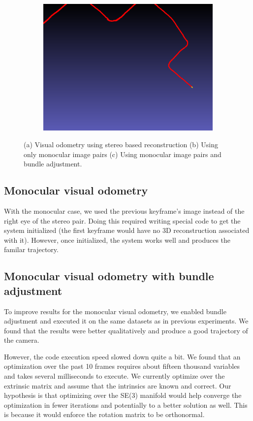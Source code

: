 \documentclass{article}
\begin{document}
\begin{figure}[h]
\begin{subfigure}[b]{.30\textwidth}
        \caption{}
    \end{subfigure}
    \begin{subfigure}[b]{.30\textwidth}
        \includegraphics[width=\linewidth]{./mono-ba.png}
        \caption{}
    \end{subfigure}
    \caption{(a) Visual odometry using stereo based reconstruction (b) Using only monocular image pairs (c) Using monocular image pairs and bundle adjustment.}
\end{figure}

\subsection{Monocular visual odometry}
With the monocular case, we used the previous keyframe's image instead of the right eye of the stereo pair. Doing this required writing special code to get the system initialized (the first keyframe would have no 3D reconstruction associated with it). However, once initialized, the system works well and produces the familar trajectory.

\subsection{Monocular visual odometry with bundle adjustment}
To improve results for the monocular visual odometry, we enabled bundle adjustment and executed it on the same datasets as in previous experiments. We found that the results were better qualitatively and produce a good trajectory of the camera.

However, the code execution speed slowed down quite a bit. We found that an optimization over the past 10 frames requires about fifteen thousand variables and takes several milliseconds to execute. We currently optimize over the extrinsic matrix and assume that the intrinsics are known and correct. Our hypothesis is that optimizing over the SE(3) manifold would help converge the optimization in fewer iterations and potentially to a better solution as well. This is because it would enforce the rotation matrix to be orthonormal.
\end{document}
